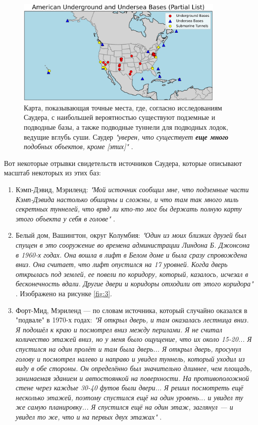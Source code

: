 \documentclass[10pt,twocolumn,letterpaper]{article}
\begin{document}
\begin{figure}[t]
\begin{center}
\includegraphics[width=0.9\textwidth]{basescrop.png}
\end{center}
   \caption{Карта, показывающая точные места, где, согласно исследованиям Саудера, с наибольшей вероятностью существуют подземные и подводные базы, а также подводные туннели для подводных лодок, ведущие вглубь суши. Саудер \textit{"уверен, что существует \textbf{еще много} подобных объектов, кроме [этих]"} \cite{22}.}
   \label{fig:4}
\end{figure}

Вот некоторые отрывки свидетельств источников Саудера, которые описывают масштаб некоторых из этих баз:
\begin{flushleft}
\begin{enumerate}
    \item Кэмп-Дэвид, Мэриленд: \textit{"Мой источник сообщил мне, что подземные части Кэмп-Дэвида настолько обширны и сложны, и что там так много миль секретных туннелей, что вряд ли кто-то мог бы держать полную карту этого объекта у себя в голове"} \cite{22}.
    \item Белый дом, Вашингтон, округ Колумбия: \textit{"Один из моих близких друзей был спущен в это сооружение во времена администрации Линдона Б. Джонсона в 1960-х годах. Она вошла в лифт в Белом доме и была сразу спровождена вниз. Она считает, что лифт опустился на 17 уровней. Когда дверь открылась под землей, ее повели по коридору, который, казалось, исчезал в бесконечность вдали. Другие двери и коридоры отходили от этого коридора"} \cite{22}. Изображено на рисунке \ref{fig:3}.
    \item Форт-Мид, Мэриленд — по словам источника, который случайно оказался в "подвале" в 1970-х годах: \textit{"Я открыл дверь, и там оказалась лестница вниз. Я подошёл к краю и посмотрел вниз между перилами. Я не считал количество этажей вниз, но у меня было ощущение, что их около 15-20... Я спустился на один пролёт и там была дверь... Я открыл дверь, просунул голову и посмотрел налево и направо и увидел туннель, который уходил из виду в обе стороны. Он определённо был значительно длиннее, чем площадь, занимаемая зданием и автостоянкой на поверхности. На противоположной стене через каждые 30-40 футов были двери... Я решил посмотреть ещё несколько этажей, поэтому спустился ещё на один уровень... и увидел ту же самую планировку... Я спустился ещё на один этаж, заглянул — и увидел то же, что и на первых двух этажах"} \cite{22}.
\end{enumerate}
\end{flushleft}
\end{document}
